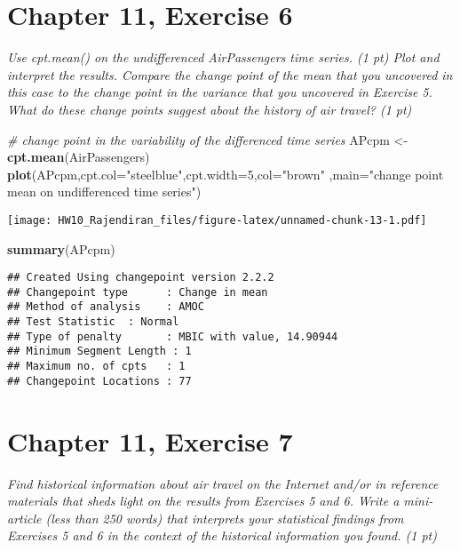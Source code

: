\documentclass[]{article}
\newenvironment{Shaded}{\begin{snugshade}}{\end{snugshade}}
\newcommand{\CommentTok}[1]{\textcolor[rgb]{0.56,0.35,0.01}{\textit{#1}}}
\newcommand{\DataTypeTok}[1]{\textcolor[rgb]{0.13,0.29,0.53}{#1}}
\newcommand{\DecValTok}[1]{\textcolor[rgb]{0.00,0.00,0.81}{#1}}
\newcommand{\KeywordTok}[1]{\textcolor[rgb]{0.13,0.29,0.53}{\textbf{#1}}}
\newcommand{\NormalTok}[1]{#1}
\newcommand{\StringTok}[1]{\textcolor[rgb]{0.31,0.60,0.02}{#1}}
\begin{document}
\hypertarget{chapter-11-exercise-6}{%
\section{Chapter 11, Exercise 6}\label{chapter-11-exercise-6}}

\emph{Use cpt.mean() on the undifferenced AirPassengers time series. (1
pt) Plot and interpret the results. Compare the change point of the mean
that you uncovered in this case to the change point in the variance that
you uncovered in Exercise 5. What do these change points suggest about
the history of air travel? (1 pt)}

\begin{Shaded}
\begin{Highlighting}[]
\CommentTok{# change point in the variability of the differenced time series}
\NormalTok{APcpm <-}\StringTok{ }\KeywordTok{cpt.mean}\NormalTok{(AirPassengers)}
\KeywordTok{plot}\NormalTok{(APcpm,}\DataTypeTok{cpt.col=}\StringTok{"steelblue"}\NormalTok{,}\DataTypeTok{cpt.width=}\DecValTok{5}\NormalTok{,}\DataTypeTok{col=}\StringTok{"brown"}
\NormalTok{     ,}\DataTypeTok{main=}\StringTok{"change point mean on undifferenced time series"}\NormalTok{)}
\end{Highlighting}
\end{Shaded}

\texttt{[image: HW10\_Rajendiran\_files/figure-latex/unnamed-chunk-13-1.pdf]}

\begin{Shaded}
\begin{Highlighting}[]
\KeywordTok{summary}\NormalTok{(APcpm)}
\end{Highlighting}
\end{Shaded}

\begin{verbatim}
## Created Using changepoint version 2.2.2 
## Changepoint type      : Change in mean 
## Method of analysis    : AMOC 
## Test Statistic  : Normal 
## Type of penalty       : MBIC with value, 14.90944 
## Minimum Segment Length : 1 
## Maximum no. of cpts   : 1 
## Changepoint Locations : 77
\end{verbatim}

\hypertarget{chapter-11-exercise-7}{%
\section{Chapter 11, Exercise 7}\label{chapter-11-exercise-7}}

\emph{Find historical information about air travel on the Internet
and/or in reference materials that sheds light on the results from
Exercises 5 and 6. Write a mini-article (less than 250 words) that
interprets your statistical findings from Exercises 5 and 6 in the
context of the historical information you found. (1 pt)}
\end{document}
